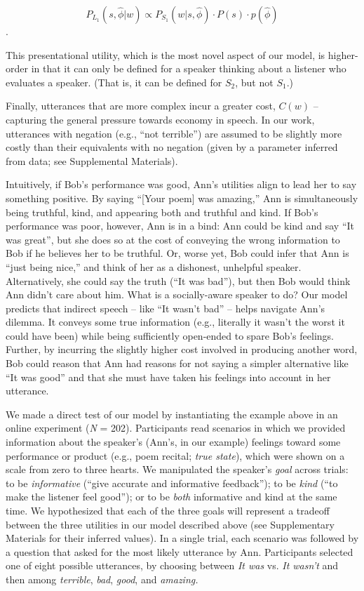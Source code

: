 \documentclass[12pt]{article}
\begin{document}
\[P_{L_1}(s, \hat{\phi} | w) \propto P_{S_1}(w | s, \hat{\phi}) \cdot P(s) \cdot p(\hat{\phi})\].

This presentational utility, which is the most novel aspect of our
model, is higher-order in that it can only be defined for a speaker
thinking about a listener who evaluates a speaker. (That is, it can be
defined for \(S_2\), but not \(S_1\).)

Finally, utterances that are more complex incur a greater cost, \(C(w)\)
-- capturing the general pressure towards economy in speech. In our
work, utterances with negation (e.g., \enquote{not terrible}) are
assumed to be slightly more costly than their equivalents with no
negation (given by a parameter inferred from data; see Supplemental
Materials).

Intuitively, if Bob's performance was good, Ann's utilities align to
lead her to say something positive. By saying \enquote{{[}Your poem{]}
was amazing,} Ann is simultaneously being truthful, kind, and appearing
both and truthful and kind. If Bob's performance was poor, however, Ann
is in a bind:
 Ann could be kind and say \enquote{It was great}, but she does so 
 at the cost of conveying the wrong information to Bob if he believes 
 her to be truthful. Or, worse yet, Bob could infer that Ann is
\enquote{just being nice,} and think of her as a dishonest, unhelpful speaker. 
Alternatively, she could say the truth
(\enquote{It was bad}), but then Bob would think Ann didn't care about
him. What is a socially-aware speaker to do? Our model predicts that
indirect speech -- like \enquote{It wasn't bad} -- helps navigate Ann's
dilemma. It conveys some true information (e.g., literally it wasn't the
worst it could have been) while being sufficiently open-ended to spare
Bob's feelings. Further, by incurring the slightly higher cost involved
in producing another word, Bob could reason that Ann had reasons for not
saying a simpler alternative like \enquote{It was good} and that she
must have taken his feelings into account in her utterance.


We made a direct test of our model by instantiating the example above in
an online experiment (\emph{N} = 202). Participants read
scenarios in which we provided information about the speaker's (Ann's,
in our example) feelings toward some performance or product (e.g., poem
recital; \emph{true state}), which were shown on a scale from zero to
three hearts. We manipulated the
speaker's \emph{goal} across trials: to be \emph{informative}
(\enquote{give accurate and informative feedback}); to be \emph{kind}
(\enquote{to make the listener feel good}); or to be \emph{both}
informative and kind at the same time. We hypothesized that each of
the three goals will represent a tradeoff between the three utilities in
our model described above (see Supplementary Materials for their inferred values). 
In a single trial, each scenario was followed
by a question that asked for the most likely utterance by Ann.
Participants selected one of eight possible utterances, by choosing
between \emph{It was} vs. \emph{It wasn't} and then among
\emph{terrible}, \emph{bad}, \emph{good}, and \emph{amazing.}
\end{document}
